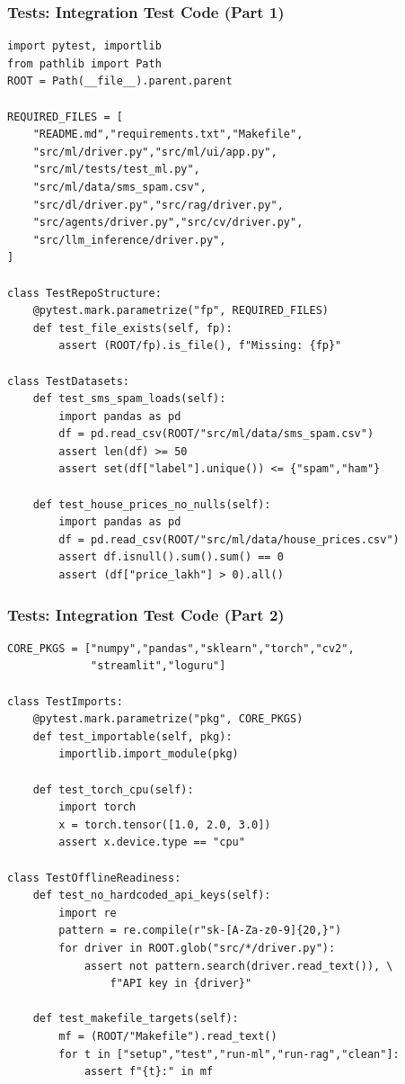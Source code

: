 \begin{frame}[fragile]\frametitle{Tests: Integration Test Code (Part 1)}
\begin{lstlisting}
import pytest, importlib
from pathlib import Path
ROOT = Path(__file__).parent.parent

REQUIRED_FILES = [
    "README.md","requirements.txt","Makefile",
    "src/ml/driver.py","src/ml/ui/app.py",
    "src/ml/tests/test_ml.py",
    "src/ml/data/sms_spam.csv",
    "src/dl/driver.py","src/rag/driver.py",
    "src/agents/driver.py","src/cv/driver.py",
    "src/llm_inference/driver.py",
]

class TestRepoStructure:
    @pytest.mark.parametrize("fp", REQUIRED_FILES)
    def test_file_exists(self, fp):
        assert (ROOT/fp).is_file(), f"Missing: {fp}"

class TestDatasets:
    def test_sms_spam_loads(self):
        import pandas as pd
        df = pd.read_csv(ROOT/"src/ml/data/sms_spam.csv")
        assert len(df) >= 50
        assert set(df["label"].unique()) <= {"spam","ham"}

    def test_house_prices_no_nulls(self):
        import pandas as pd
        df = pd.read_csv(ROOT/"src/ml/data/house_prices.csv")
        assert df.isnull().sum().sum() == 0
        assert (df["price_lakh"] > 0).all()
\end{lstlisting}
\end{frame}

\begin{frame}[fragile]\frametitle{Tests: Integration Test Code (Part 2)}
\begin{lstlisting}
CORE_PKGS = ["numpy","pandas","sklearn","torch","cv2",
             "streamlit","loguru"]

class TestImports:
    @pytest.mark.parametrize("pkg", CORE_PKGS)
    def test_importable(self, pkg):
        importlib.import_module(pkg)

    def test_torch_cpu(self):
        import torch
        x = torch.tensor([1.0, 2.0, 3.0])
        assert x.device.type == "cpu"

class TestOfflineReadiness:
    def test_no_hardcoded_api_keys(self):
        import re
        pattern = re.compile(r"sk-[A-Za-z0-9]{20,}")
        for driver in ROOT.glob("src/*/driver.py"):
            assert not pattern.search(driver.read_text()), \
                f"API key in {driver}"

    def test_makefile_targets(self):
        mf = (ROOT/"Makefile").read_text()
        for t in ["setup","test","run-ml","run-rag","clean"]:
            assert f"{t}:" in mf
\end{lstlisting}
\end{frame}

